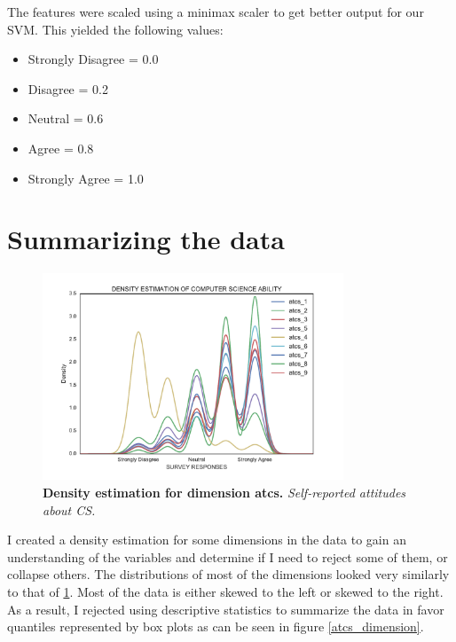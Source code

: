 The features were scaled using a minimax scaler to get better output for our SVM. This yielded the following values:
\begin {itemize}    
\item Strongly Disagree = 0.0
\item Disagree = 0.2
\item Neutral = 0.6
\item Agree = 0.8
\item Strongly Agree = 1.0
\end{itemize} 



\section*{Summarizing the data}
\begin{figure}[!hbtp]
\centering
    \caption{\textbf{Density estimation for dimension atcs. }\textit{Self-reported attitudes about CS.}}\label{atcs}
    \includegraphics[width=0.8\textwidth]{figures/atcs}
\end{figure}
I created a density estimation for some dimensions in the data to gain an understanding of the variables and determine if I need to reject some of them, or collapse others. The distributions of most of the dimensions looked very similarly to that of \ref{atcs}. Most of the data is either skewed to the left or skewed to the right. As a result, I rejected using descriptive statistics to summarize the data in favor quantiles represented by box plots as can be seen in figure \ref{atcs_dimension}. 
